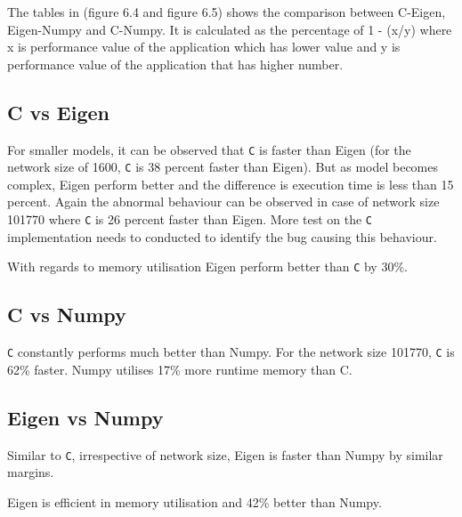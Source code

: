 The tables in (figure 6.4 and figure 6.5) shows the comparison between C-Eigen, Eigen-Numpy and C-Numpy. It is calculated as the percentage of 1 - (x/y) where x is performance value of the application which has lower value and y is performance value of the application that has higher number.

\subsection{C vs Eigen}
For smaller models, it can be observed that \texttt{C} is faster than Eigen (for the network size of 1600, \texttt{C} is 38 percent faster than Eigen). But as model becomes complex, Eigen perform better and the difference is execution time is less than 15 percent. Again the abnormal behaviour can be observed in case of network size 101770 where \texttt{C} is 26 percent faster than Eigen. More test on the \texttt{C} implementation needs to conducted to identify the bug causing this behaviour.

With regards to memory utilisation Eigen perform better than \texttt{C} by 30\%.

\subsection{C vs Numpy}
\texttt{C} constantly performs much better than Numpy. For the network size 101770, \texttt{C} is 62\% faster.
Numpy utilises 17\% more runtime memory than C.

\subsection{Eigen vs Numpy}
Similar to \texttt{C}, irrespective of network size, Eigen is faster than Numpy by similar margins.

Eigen is efficient in memory utilisation and 42\% better than Numpy.



